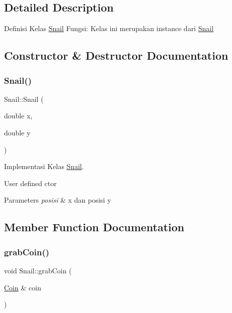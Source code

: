 \subsection{Detailed Description}
Definisi Kelas \mbox{\hyperlink{class_snail}{Snail}} Fungsi\+: Kelas ini merupakan instance dari \mbox{\hyperlink{class_snail}{Snail}} 

\subsection{Constructor \& Destructor Documentation}
\mbox{\label{class_snail_a8a24e3446fddbfbbd064c5ee9337fa90}} 
\subsubsection{\texorpdfstring{Snail()}{Snail()}}
{\footnotesize\ttfamily Snail\+::\+Snail (\begin{DoxyParamCaption}\item[{double}]{x,  }\item[{double}]{y }\end{DoxyParamCaption})}



Implementasi Kelas \mbox{\hyperlink{class_snail}{Snail}}. 

User defined ctor 
\begin{DoxyParams}{Parameters}
{\em posisi} & x dan posisi y \\
\hline
\end{DoxyParams}


\subsection{Member Function Documentation}
\mbox{\label{class_snail_a5978e47ea4eeb7dce4890d1d8121de7e}} 
\subsubsection{\texorpdfstring{grab\+Coin()}{grabCoin()}}
{\footnotesize\ttfamily void Snail\+::grab\+Coin (\begin{DoxyParamCaption}\item[{\mbox{\hyperlink{class_coin}{Coin}} \&}]{coin }\end{DoxyParamCaption})}

